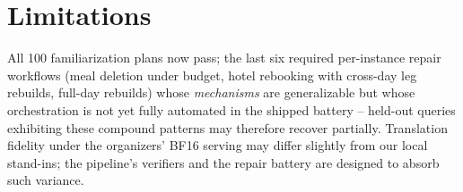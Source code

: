 \documentclass[11pt,a4paper]{article}
\begin{document}
\section{Limitations}

All 100 familiarization plans now pass; the last six required per-instance
repair workflows (meal deletion under budget, hotel rebooking with cross-day
leg rebuilds, full-day rebuilds) whose \emph{mechanisms} are generalizable
but whose orchestration is not yet fully automated in the shipped battery --
held-out queries exhibiting these compound patterns may therefore recover
partially. Translation fidelity
under the organizers' BF16 serving may differ slightly from our local
stand-ins; the pipeline's verifiers and the repair battery are designed to
absorb such variance.
\end{document}
